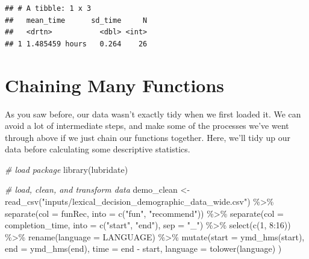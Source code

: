 \documentclass[
]{book}
\newenvironment{Shaded}{\begin{snugshade}}{\end{snugshade}}
\newcommand{\AttributeTok}[1]{\textcolor[rgb]{0.77,0.63,0.00}{#1}}
\newcommand{\CommentTok}[1]{\textcolor[rgb]{0.56,0.35,0.01}{\textit{#1}}}
\newcommand{\DecValTok}[1]{\textcolor[rgb]{0.00,0.00,0.81}{#1}}
\newcommand{\FunctionTok}[1]{\textcolor[rgb]{0.00,0.00,0.00}{#1}}
\newcommand{\NormalTok}[1]{#1}
\newcommand{\OtherTok}[1]{\textcolor[rgb]{0.56,0.35,0.01}{#1}}
\newcommand{\SpecialCharTok}[1]{\textcolor[rgb]{0.00,0.00,0.00}{#1}}
\newcommand{\StringTok}[1]{\textcolor[rgb]{0.31,0.60,0.02}{#1}}
\begin{document}
\begin{verbatim}
## # A tibble: 1 x 3
##   mean_time      sd_time     N
##   <drtn>           <dbl> <int>
## 1 1.485459 hours   0.264    26
\end{verbatim}

\hypertarget{chaining-many-functions}{%
\section{Chaining Many Functions}\label{chaining-many-functions}}

As you saw before, our data wasn't exactly tidy when we first loaded it. We can avoid a lot of intermediate steps, and make some of the processes we've went through above if we just chain our functions together. Here, we'll tidy up our data before calculating some descriptive statistics.

\begin{Shaded}
\begin{Highlighting}[]
\CommentTok{\# load package}
\FunctionTok{library}\NormalTok{(lubridate)}

\CommentTok{\# load, clean, and transform data}
\NormalTok{demo\_clean }\OtherTok{\textless{}{-}} \FunctionTok{read\_csv}\NormalTok{(}\StringTok{"inputs/lexical\_decision\_demographic\_data\_wide.csv"}\NormalTok{) }\SpecialCharTok{\%\textgreater{}\%}
  \FunctionTok{separate}\NormalTok{(}\AttributeTok{col =}\NormalTok{ funRec, }\AttributeTok{into =} \FunctionTok{c}\NormalTok{(}\StringTok{"fun"}\NormalTok{, }\StringTok{"recommend"}\NormalTok{)) }\SpecialCharTok{\%\textgreater{}\%}
  \FunctionTok{separate}\NormalTok{(}\AttributeTok{col =}\NormalTok{ completion\_time, }\AttributeTok{into =} \FunctionTok{c}\NormalTok{(}\StringTok{"start"}\NormalTok{, }\StringTok{"end"}\NormalTok{), }\AttributeTok{sep =} \StringTok{"\_"}\NormalTok{) }\SpecialCharTok{\%\textgreater{}\%}
  \FunctionTok{select}\NormalTok{(}\FunctionTok{c}\NormalTok{(}\DecValTok{1}\NormalTok{, }\DecValTok{8}\SpecialCharTok{:}\DecValTok{16}\NormalTok{)) }\SpecialCharTok{\%\textgreater{}\%}
  \FunctionTok{rename}\NormalTok{(}\AttributeTok{language =}\NormalTok{ LANGUAGE) }\SpecialCharTok{\%\textgreater{}\%}
  \FunctionTok{mutate}\NormalTok{(}\AttributeTok{start =} \FunctionTok{ymd\_hms}\NormalTok{(start),}
         \AttributeTok{end =} \FunctionTok{ymd\_hms}\NormalTok{(end),}
         \AttributeTok{time =}\NormalTok{ end }\SpecialCharTok{{-}}\NormalTok{ start,}
         \AttributeTok{language =} \FunctionTok{tolower}\NormalTok{(language)}
\NormalTok{         )}
\end{Highlighting}
\end{Shaded}
\end{document}
